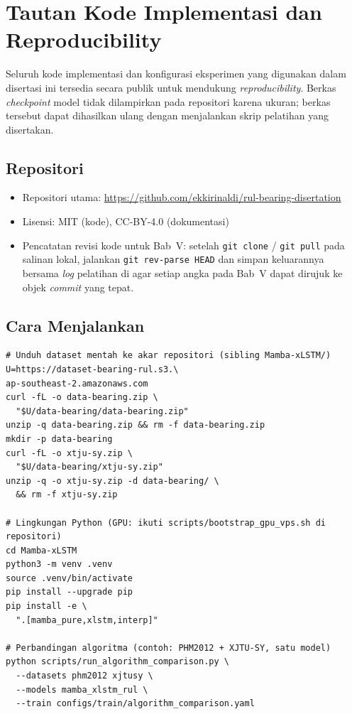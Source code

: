 
\chapter{Tautan Kode Implementasi dan Reproducibility}
\label{lamp:kode}

Seluruh kode implementasi dan konfigurasi eksperimen yang digunakan dalam
disertasi ini tersedia secara publik untuk mendukung
\emph{reproducibility}.
Berkas \emph{checkpoint} model tidak dilampirkan pada repositori karena
ukuran; berkas tersebut dapat dihasilkan ulang dengan menjalankan
skrip pelatihan yang disertakan.

\section{Repositori}
\label{lamp:kode_repo}

\begin{itemize}
  \item Repositori utama:
        \url{https://github.com/ekkirinaldi/rul-bearing-disertation}
  \item Lisensi: MIT (kode), CC-BY-4.0 (dokumentasi)
  \item Pencatatan revisi kode untuk Bab~V: setelah
        \texttt{git clone} / \texttt{git pull} pada salinan lokal,
        jalankan \texttt{git rev-parse HEAD} dan simpan keluarannya
        bersama \emph{log} pelatihan di
         agar setiap angka pada
        Bab~V dapat dirujuk ke objek \emph{commit} yang tepat.
\end{itemize}

\section{Cara Menjalankan}
\label{lamp:kode_run}

{\footnotesize
\begin{verbatim}
# Unduh dataset mentah ke akar repositori (sibling Mamba-xLSTM/)
U=https://dataset-bearing-rul.s3.\
ap-southeast-2.amazonaws.com
curl -fL -o data-bearing.zip \
  "$U/data-bearing/data-bearing.zip"
unzip -q data-bearing.zip && rm -f data-bearing.zip
mkdir -p data-bearing
curl -fL -o xtju-sy.zip \
  "$U/data-bearing/xtju-sy.zip"
unzip -q -o xtju-sy.zip -d data-bearing/ \
  && rm -f xtju-sy.zip

# Lingkungan Python (GPU: ikuti scripts/bootstrap_gpu_vps.sh di repositori)
cd Mamba-xLSTM
python3 -m venv .venv
source .venv/bin/activate
pip install --upgrade pip
pip install -e \
  ".[mamba_pure,xlstm,interp]"

# Perbandingan algoritma (contoh: PHM2012 + XJTU-SY, satu model)
python scripts/run_algorithm_comparison.py \
  --datasets phm2012 xjtusy \
  --models mamba_xlstm_rul \
  --train configs/train/algorithm_comparison.yaml
\end{verbatim}
}

